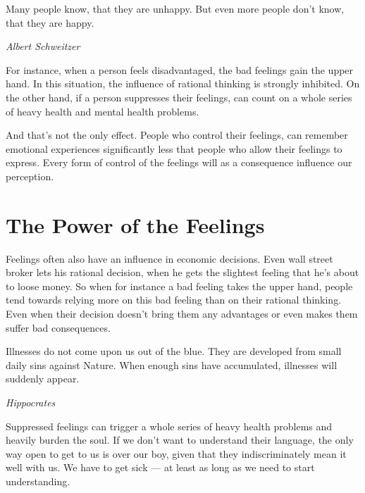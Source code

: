 \documentclass[../Book.Stress_regulation.tex]{subfiles}
\begin{document}
\epigraph{Many people know, that they are unhappy. But even more people don't know, that they are happy.}{\textit{Albert Schweitzer}}

For instance, when a person feels disadvantaged, the bad feelings gain the upper hand.
In this situation, the influence of rational thinking is strongly inhibited.
On the other hand, if a person suppresses their feelings, can count on a whole series of heavy health and mental health problems.

And that's not the only effect.
People who control their feelings, can remember emotional experiences significantly less that people who allow their feelings to express.
Every form of control of the feelings will as a consequence influence our perception.

\section{The Power of the Feelings}


Feelings often also have an influence in economic decisions.
Even wall street broker lets his rational decision, when he gets the slightest feeling that he's about to loose money.
So when for instance a bad feeling takes the upper hand, people tend towards relying more on this bad feeling than on their rational thinking.
Even when their decision doesn't bring them any advantages or even makes them suffer bad consequences.

\epigraph{Illnesses do not come upon us out of the blue. They are developed from small daily sins against Nature.
  When enough sins have accumulated, illnesses will suddenly appear.}{\textit{Hippocrates}}

Suppressed feelings can trigger a whole series of heavy health problems and heavily burden the soul.
If we don't want to understand their language, the only way open to get to us is over our boy, given that they indiscriminately mean it well with us.
We have to get sick --- at least as long as we need to start understanding.

\vspace{1cm}
\end{document}
